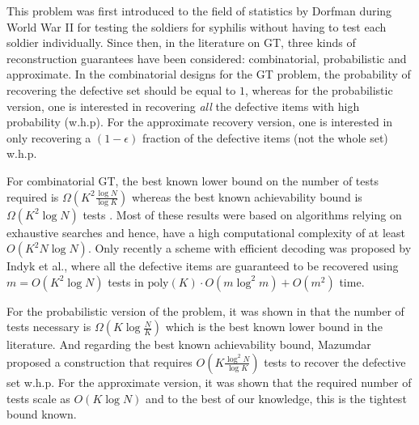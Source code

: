 \documentclass[conference,twocolumn]{IEEEtran}
\begin{document}
This problem was first introduced to the field of statistics by Dorfman \cite{dorfman1943detection} during World War II for testing the soldiers for syphilis without having to test each soldier individually.
Since then, in the literature on GT, three kinds of reconstruction guarantees have been considered: combinatorial, probabilistic and approximate. In the combinatorial designs for the GT problem, the probability of recovering the defective set should be equal to $1$, whereas for the probabilistic version, one is interested in recovering \textit{all} the defective items with high probability (w.h.p).
For the approximate recovery version, one is interested in only recovering a $(1-\epsilon)$ fraction of the defective items (not the whole set) w.h.p. %

For combinatorial GT, the best known lower bound on the number of tests required is $\Omega(K^2\frac{\log N}{\log K})$ \cite{d1982bounds,erdos1985families} whereas the best known achievability bound is $\Omega(K^2 \log N)$ tests \cite{kautz1964nonrandom,porat2011explicit}. Most of these results were based on algorithms relying on exhaustive searches and hence, have a high computational complexity of at least $O(K^2 N\log N)$. Only recently a scheme with efficient decoding was proposed by Indyk et al., \cite{indyk2010efficiently} where all the defective items are guaranteed to be recovered using $m=O(K^2\log N)$ tests in $\text{poly}(K)\cdot O(m \log^2 m )+O(m^2)$ time.

For the probabilistic version of the problem, it was shown in \cite{chan2014non,atia2012boolean} that the number of tests necessary is $\Omega(K\log \frac{N}{K})$ which is the best known lower bound in the literature. And regarding the best known achievability bound, Mazumdar \cite{mazumdar2015nonadaptive} proposed a construction that requires $O(K\frac{\log^2 N}{\log K})$ tests to recover the defective set w.h.p. For the approximate version, it was shown \cite{atia2012boolean} that the required number of tests scale as $O(K\log N)$ and to the best of our knowledge, this is the tightest bound known.
\end{document}
